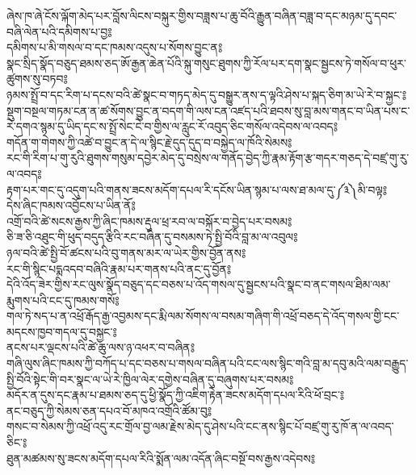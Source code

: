 {\ti ཞེས་ཁ་ཞེ་ངོས་ལྐོག་མེད་པར་བློས་ལིངས་བསྐུར་གྱིས་བཟླས་པ་ཆུ་བོའི་རྒྱུན་བཞིན་བཟླ་བ་དང་མཉམ་དུ་དབང་བཞི་ལེན་པའི་དམིགས་པ་བྱ༔\\
དམིགས་པ་མི་གསལ་བ་དང་ཁམས་འདུས་པ་སོགས་བྱུང་ན༔\\
སྣང་སྲིད་སྣོད་བཅུད་ཐམས་ཅད་ཨོ་རྒྱན་ཆེན་པོའི་སྐུ་གསུང་ཐུགས་ཀྱི་རོལ་པར་དག་སྣང་སྦྱངས་ཏེ་གསོལ་བ་ཕུར་ཚུགས་སུ་བཏབ༔\\
ཉམས་སྤྲོ་བ་དང་རིག་པ་དངས་བའི་ཚེ་སྣང་བ་གཏད་མེད་དུ་བསྒྱུར་ནས་ད་ལྟའི་ཤེས་པ་སྐད་ཅིག་མ་ཡེ་རེ་བ་སྐྱང་༔\\
སྡུག་བསྔལ་གཏམ་ངན་ན་ཚ་སོགས་བྱུང་ན་བདག་གི་ལས་ངན་འཛད་པའི་ཐབས་སུ་བླ་མས་གནང་བ་ཡིན་པས་ང་རེ་དགའ་སྙམ་དུ་ཡིད་དང་ས་སྤྲོ་སེང་ངེ་བ་གྱིས་ལ་རླུང་རོ་འབུད་ཅིང་གསོལ་འདེབས་ལ་འབད༔\\
གདོན་ག་གེགས་ཀྱི་འཚེ་བ་བྱུང་ན་དེ་ལ་སྙིང་རྗེ་དུད་དུད་བ་བསྐྱེད་ལ་ཁོའི་སེམས༔\\
རང་གི་རིག་པ་གུ་རུའི་ཐུགས་གསུམ་དབྱེར་མེད་དུ་བསྲེས་ལ་གནོད་བྱེད་ཀྱི་རྣམ་རྟོག་རྩ་གདར་གཅད་དེ་བཛྲ་གུ་རུ་ལ་འབད༔\\
རྟག་པར་གང་དུ་འདུག་པའི་གནས་ཟངས་མདོག་དཔལ་རི་དངོས་ཡིན་སྙམ་པ་ལས་ཐ་མལ་དུ་༼༣༽མི་བལྟ༔\\
དེས་ཞིང་ཁམས་འབྱོངས་པ་ཡིན་ནོ༔\\
འགྲོ་བའི་ཚེ་སངས་རྒྱས་ཀྱི་ཞིང་ཁམས་རྡུལ་ཕྲ་རབ་ལ་བསྐོར་བ་བྱེད་པར་བསམ༔\\
ཅི་ཟ་ཅི་འཐུང་གི་ཕུད་བདུད་རྩིའི་རང་བཞིན་དུ་བསམས་ཏེ་སྤྱི་བོའི་བླ་མ་ལ་འབུལ༔\\
ཉལ་བའི་ཚེ་སྤྱི་བོ་ཚངས་པའི་བུ་གནས་མར་ལ་ཡེར་གྱིས་བྱོན་ནས༔\\
རང་གི་སྙིང་པདྨའདབ་བཞིའི་རྣམ་པར་གནས་པའི་ནང་དུ་བྱོན༔\\
དེའི་འོད་ཟེར་གྱིས་རང་ལུས་སྣོད་བཅུད་དང་བཅས་པ་འོད་གསལ་དུ་སྦྱངས་པའི་སྣང་བ་ནང་གསལ་ཐིམ་ལམ་རྨུགས་པའི་ངང་དུ་ཁམས་གསོ༔\\
གལ་ཏེ་སད་པ་ན་འཕྲོ་རྒོད་རྒྱ་འབྱམས་དང་རྨི་ལམ་སོགས་ལ་བསམ་གཞིག་གི་འཕྲོ་བཅད་དེ་འོད་གསལ་གྱི་ངང་མདངས་ཁྱབ་གདལ་དུ་བསྐྱང་༔\\
ནངས་པར་ལྡངས་པའི་ཚེ་ཆུ་ལས་ཉ་འཕར་བ་བཞིན༔\\
གཞི་ལུས་ཞིང་ཁམས་ཀྱི་བཀོད་པ་དང་བཅས་པ་གསལ་བཞིན་པའི་ངང་ལས་སྙིང་གའི་བླ་མ་དབུ་མའི་ལམ་བརྒྱུད་སྤྱི་བོའི་སྟེང་གི་བར་སྣང་ལ་ཡེ་རེ་ཁྱིལ་ལེར་དགྱེས་བཞིན་དུ་བཞུགས་པར་བསམ༔\\
མདོར་ན་དུས་དང་རྣམ་པ་ཐམས་ཅད་དུ་ཕྱི་སྣོད་ཀྱི་འཇིག་རྟེན་ཟངས་མདོག་དཔལ་རིའི་ཕོ་བྲང་༔\\
ནང་བཅུད་ཀྱི་སེམས་ཅན་དཔའ་བོ་མཁའ་འགྲོའི་ཚོམ་བུ༔\\
གསང་བ་སེམས་ཀྱི་འཕྲོ་འདུ་རང་གྲོལ་བྱ་ལམ་རྗེས་མེད་དུ་ཤེས་པའི་ངང་ནས་སྙིང་པོ་བཛྲ་གུ་རུ་ཁོ་ན་ལ་འབད་ཅིང་༔\\
ཐུན་མཚམས་སུ་ཟངས་མདོག་དཔལ་རིའི་སྨོན་ལམ་འདོན་ཞིང་བསྔོ་བས་རྒྱས་འདེབས༔\\
}
